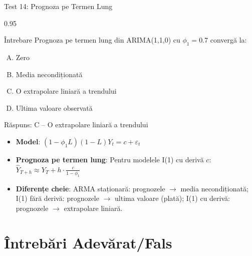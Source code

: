 \documentclass[9pt, aspectratio=169, t]{beamer}
\begin{document}
\begin{frame}{Test 14: Prognoza pe Termen Lung}
    \begin{cminipage}{0.95\textwidth}
    \begin{alertblock}{Întrebare}
        Prognoza pe termen lung din ARIMA(1,1,0) cu $\phi_1 = 0.7$ convergă la:
    \end{alertblock}

    \vspace{0.2cm}

    \begin{enumerate}[A)]\setlength{\itemsep}{0pt}
        \item Zero
        \item Media necondiționată
        \item O extrapolare liniară a trendului
        \item Ultima valoare observată
    \end{enumerate}

    \vspace{0.3cm}
    \pause
    \begin{exampleblock}{Răspuns: C -- O extrapolare liniară a trendului}
        \begin{itemize}\setlength{\itemsep}{0pt}
        \item \textbf{Model}: $(1-\phi_1 L)(1-L)Y_t = c + \varepsilon_t$
        \item \textbf{Prognoza pe termen lung}: Pentru modelele I(1) cu derivă $c$:
        $\hat{Y}_{T+h} \approx Y_T + h \cdot \frac{c}{1-\phi_1}$
        \item \textbf{Diferențe cheie}: ARMA staționară: prognozele $\to$ media necondiționată;
        I(1) fără derivă: prognozele $\to$ ultima valoare (plată);
        I(1) cu derivă: prognozele $\to$ extrapolare liniară.
        \end{itemize}
    \end{exampleblock}
    \end{cminipage}
\end{frame}

\section{Întrebări Adevărat/Fals}
\end{document}
